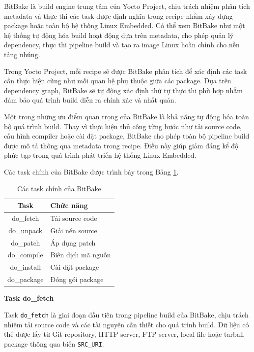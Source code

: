 BitBake là build engine trung tâm của Yocto Project, chịu trách nhiệm phân tích metadata và thực thi các task được định nghĩa trong recipe nhằm xây dựng package hoặc toàn bộ hệ thống Linux Embedded. Có thể xem BitBake như một hệ thống tự động hóa build hoạt động dựa trên metadata, cho phép quản lý dependency, thực thi pipeline build và tạo ra image Linux hoàn chỉnh cho nền tảng nhúng.

Trong Yocto Project, mỗi recipe sẽ được BitBake phân tích để xác định các task cần thực hiện cũng như mối quan hệ phụ thuộc giữa các package. Dựa trên dependency graph, BitBake sẽ tự động xác định thứ tự thực thi phù hợp nhằm đảm bảo quá trình build diễn ra chính xác và nhất quán.

Một trong những ưu điểm quan trọng của BitBake là khả năng tự động hóa toàn bộ quá trình build. Thay vì thực hiện thủ công từng bước như tải source code, cấu hình compiler hoặc cài đặt package, BitBake cho phép toàn bộ pipeline build được mô tả thông qua metadata trong recipe. Điều này giúp giảm đáng kể độ phức tạp trong quá trình phát triển hệ thống Linux Embedded.

Các task chính của BitBake được trình bày trong Bảng \ref{tab:bitbake_tasks}.

\begin{table}[H]
\centering
\begin{tabular}{|c|l|}
\hline
\textbf{Task} & \textbf{Chức năng} \\ \hline
do\_fetch & Tải source code \\ \hline
do\_unpack & Giải nén source \\ \hline
do\_patch & Áp dụng patch \\ \hline
do\_compile & Biên dịch mã nguồn \\ \hline
do\_install & Cài đặt package \\ \hline
do\_package & Đóng gói package \\ \hline
\end{tabular}
\caption{Các task chính của BitBake}
\label{tab:bitbake_tasks}
\end{table}

\noindent \textbf{Task do\_fetch}

Task \texttt{do\_fetch} là giai đoạn đầu tiên trong pipeline build của BitBake, chịu trách nhiệm tải source code và các tài nguyên cần thiết cho quá trình build. Dữ liệu có thể được lấy từ Git repository, HTTP server, FTP server, local file hoặc tarball package thông qua biến \texttt{SRC\_URI}.

